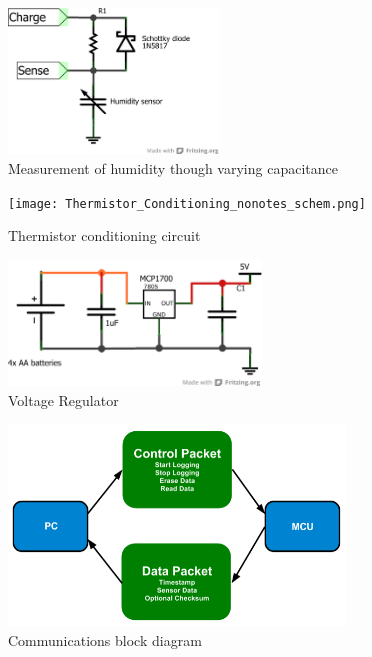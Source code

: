 \documentclass[a4paper,11pt]{article}  %
\begin{document}
\begin{figure}[!h]
  \begin{center}
    \includegraphics[width=0.5\textwidth]{humiditysensor_schem.png}
  \end{center}
  \caption{Measurement of humidity though varying capacitance}
  \label{fig:humcir}
\end{figure}

\begin{figure}[!h]
  \begin{center}
    \texttt{[image: Thermistor\_Conditioning\_nonotes\_schem.png]}
  \end{center}
  \caption{Thermistor conditioning circuit}
  \label{fig:tempcond}
\end{figure}

\begin{figure}[!h]
  \begin{center}
    \includegraphics[width=0.6\textwidth]{power_schem.png}
  \end{center}
  \caption{Voltage Regulator}
  \label{fig:voltreg}
\end{figure}

\begin{figure}[!h]
  \begin{center}
    \includegraphics[width=0.8\textwidth]{comms_diagram.png}
  \end{center}
  \caption{Communications block diagram}
  \label{fig:commsdiag}
\end{figure}
\end{document}

